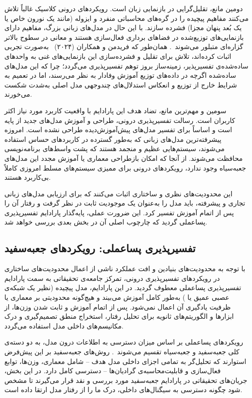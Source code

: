 دومین مانع، تقلیل‌گرایی در بازنمایی زبان است. رویکردهای درونی کلاسیک غالباً تلاش می‌کنند مفاهیم پیچیده را در گره‌های محاسباتی منفرد و ایزوله (مانند یک نورون خاص یا یک بُعد پنهان مجزا) فشرده سازند. با این حال در مدل‌های زبانی بزرگ، مفاهیم دارای بازنمایی‌های توزیع‌شده در فضا‌های برداری فعال‌سازی هستند و معانی در سطوح بالاتر گزاره‌ای متبلور می‌شوند~\cite{zou2023representationengineering}. همان‌طور که فریدمن و همکاران (۲۰۲۴)~\cite{friedman2024interpretability} به‌صورت تجربی اثبات کرده‌اند، تلاش برای تقلیل و فشرده‌سازی این بازنمایی‌های غنی به واحدهای ساده‌شده‌ی تفسیرپذیر، زمینه‌ساز بروز توهم تفسیرپذیری می‌گردد؛ چرا که این مدل‌های ساده‌شده اگرچه در داده‌های توزیع آموزش وفادار به نظر می‌رسند، اما در تعمیم به شرایط خارج از توزیع و انعکاس استدلال‌های چندوجهی مدل اصلی به‌شدت شکست می‌خورند.

سومین و مهم‌ترین مانع، تضاد هدف این پارادایم با واقعیت کاربرد مورد نیاز اکثر کاربران است. رسالت تفسیرپذیری درونی، طراحی و آموزش مدل‌های جدید از پایه است و اساساً برای تفسیر مدل‌های پیش‌آموزش‌دیده طراحی نشده است. امروزه پیشرفته‌ترین مدل‌های زبانی که به‌طور گسترده در کاربردهای حساس استفاده می‌شوند، سیستم‌هایی عظیم و منجمد هستند که پشت واسط‌های برنامه‌نویسی محافظت می‌شوند. از آنجا که امکان بازطراحی معماری یا آموزش مجدد این مدل‌های جعبه‌سیاه وجود ندارد، رویکردهای درونی برای ممیزی سیستم‌های مسلط امروزی کاملاً بی‌کاربرد هستند.

این محدودیت‌های نظری و ساختاری اثبات می‌کنند که برای ارزیابی مدل‌های زبانی تجاری و پیشرفته، باید مدل را به‌عنوان یک موجودیت ثابت در نظر گرفت و رفتار آن را پس از اتمام آموزش تفسیر کرد. این ضرورت عملی، پایه‌گذار پارادایم تفسیرپذیری پساعملی گردید که چارچوب اصلی آن در بخش بعدی بررسی خواهد شد.


\subsection{تفسیرپذیری پساعملی: رویکردهای جعبه‌سفید}\label{sec:3-1-2}

با توجه به محدودیت‌های بنیادین و افت عملکرد ناشی از اعمال محدودیت‌های ساختاری در رویکردهای تفسیرپذیری درونی، تمرکز جامعه‌ی تحقیقاتی به سمت پارادایم تفسیرپذیری پساعملی معطوف گردید. در این پارادایم، مدل پیچیده (نظیر یک شبکه‌ی عصبی عمیق یا ) به‌طور کامل آموزش می‌بیند و هیچ‌گونه محدودیتی بر معماری یا ظرفیت یادگیری آن اعمال نمی‌شود. پس از اتمام آموزش و ثابت شدن وزن‌ها، از ابزارها و الگوریتم‌های ثانویه برای تحلیل رفتار، استخراج منطق تصمیم‌گیری و درک مکانیسم‌های داخلی مدل استفاده می‌گردد.

رویکردهای پساعملی بر اساس میزان دسترسی به اطلاعات درون مدل، به دو دسته‌ی کلی جعبه‌سفید و جعبه‌سیاه تقسیم می‌شوند~\cite{guidotti2018survey, danilevsky2020survey}. روش‌های جعبه‌سفید بر این پیش‌فرض استوارند که تحلیل‌گر به تمامی اجزای داخلی مدل هدف – شامل معماری، وزن‌ها، توابع فعال‌سازی و قابلیت‌محاسبه‌ی گرادیان‌ها – دسترسی کامل دارد. در این بخش، جریان‌های تحقیقاتی در پارادایم جعبه‌سفید مورد بررسی و نقد قرار می‌گیرند تا مشخص شود چگونه دسترسی به سیگنال‌های داخلی، درک ما را از رفتار مدل ارتقا داده است.



